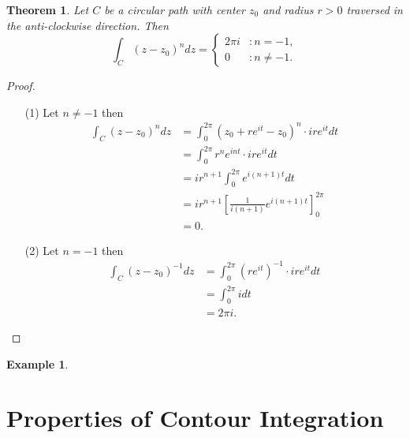\documentclass[12pt,openany]{book}
\newtheorem{theorem}{Theorem}[chapter]
\theoremstyle{definition}
\newtheorem{example}{Example}[section]
\newcommand{\of}[1]{\left( #1 \right)}
\begin{document}
	\newpage
	\begin{tcolorbox}[colframe=thmcolor, title={\color{white}\bf An Important Integral}]
		\begin{theorem}
			Let $C$ be a circular path with center $z_0$ and radius $r>0$ traversed in the anti-clockwise direction. Then \[
			\int_C\of{z-z_0}^ndz=\begin{cases}
			2\pi i &:n= -1,\\
			0 &:n\neq -1.
			\end{cases}
			\]
		\end{theorem}
	\end{tcolorbox}
	\begin{proof}
		\begin{itemize}
			\item[(1)] Let $n\neq -1$ then
			\begin{align*}
			\int_C\of{z-z_0}^ndz&=\int_0^{2\pi}\of{z_0+re^{it}-z_0}^n\cdot ire^{it}dt\\
			&=\int_0^{2\pi}r^ne^{i nt}\cdot ire^{it}dt\\
			&=ir^{n+1}\int_0^{2\pi}e^{i(n+1)t}dt\\
			&=ir^{n+1}\left[\frac{1}{i(n+1)}e^{i(n+1)t}\right]_0^{2\pi}\\
			&=0.
			\end{align*}
			\item[(2)] Let $n = -1$ then
			\begin{align*}
			\int_C\of{z-z_0}^{-1}dz&=\int_0^{2\pi}\of{re^{it}}^{-1}\cdot ire^{it}dt\\
			&=\int_0^{2\pi}i dt\\
			&=2\pi i.
			\end{align*}
		\end{itemize}
	\end{proof}
	
	\begin{example}
		
	\end{example}
	
	\newpage
	\section{Properties of Contour Integration}
	
\end{document}
